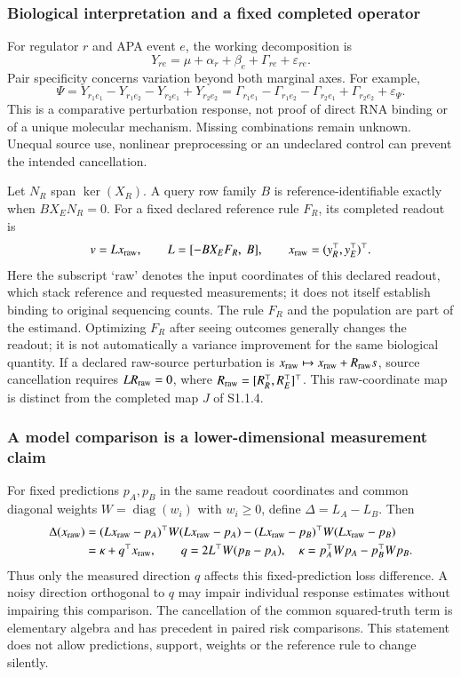 \documentclass[11pt]{article}
\begin{document}
\subsubsection{Biological interpretation and a fixed completed operator}
For regulator $r$ and APA event $e$, the working decomposition is
\[
Y_{re}=\mu+\alpha_r+\beta_e+\Gamma_{re}+\varepsilon_{re}.
\]
Pair specificity concerns variation beyond both marginal axes. For example,
\[
\Psi=Y_{r_1e_1}-Y_{r_1e_2}-Y_{r_2e_1}+Y_{r_2e_2}
=\Gamma_{r_1e_1}-\Gamma_{r_1e_2}-\Gamma_{r_2e_1}+\Gamma_{r_2e_2}+\varepsilon_\Psi.
\]
This is a comparative perturbation response, not proof of direct RNA binding or of a unique molecular mechanism. Missing combinations remain unknown. Unequal source use, nonlinear preprocessing or an undeclared control can prevent the intended cancellation.

Let $N_R$ span $\ker(X_R)$. A query row family $B$ is reference-identifiable exactly when $BX_EN_R=0$. For a fixed declared reference rule $F_R$, its completed readout is
\[
v=Lx_{\rm raw},\qquad L=[-BX_EF_R,\ B],\qquad x_{\rm raw}=(y_R^\top,y_E^\top)^\top.
\]
Here the subscript `raw' denotes the input coordinates of this declared readout, which stack reference and requested measurements; it does not itself establish binding to original sequencing counts. The rule $F_R$ and the population are part of the estimand. Optimizing $F_R$ after seeing outcomes generally changes the readout; it is not automatically a variance improvement for the same biological quantity. If a declared raw-source perturbation is $x_{\rm raw}\mapsto x_{\rm raw}+R_{\rm raw}s$, source cancellation requires $LR_{\rm raw}=0$, where $R_{\rm raw}=[R_R^\top,R_E^\top]^\top$. This raw-coordinate map is distinct from the completed map $J$ of S1.1.4.

\subsubsection{A model comparison is a lower-dimensional measurement claim}
For fixed predictions $p_A,p_B$ in the same readout coordinates and common diagonal weights $W=\operatorname{diag}(w_i)$ with $w_i\geq0$, define $\Delta=L_A-L_B$. Then
\begin{align}
\Delta(x_{\rm raw})&=(Lx_{\rm raw}-p_A)^\top W(Lx_{\rm raw}-p_A)-(Lx_{\rm raw}-p_B)^\top W(Lx_{\rm raw}-p_B)\\
&=\kappa+q^\top x_{\rm raw},\qquad
q=2L^\top W(p_B-p_A),\quad
\kappa=p_A^\top Wp_A-p_B^\top Wp_B.
\label{eq:rawlossclaim}
\end{align}
Thus only the measured direction $q$ affects this fixed-prediction loss difference. A noisy direction orthogonal to $q$ may impair individual response estimates without impairing this comparison. The cancellation of the common squared-truth term is elementary algebra and has precedent in paired risk comparisons. This statement does not allow predictions, support, weights or the reference rule to change silently.
\end{document}
